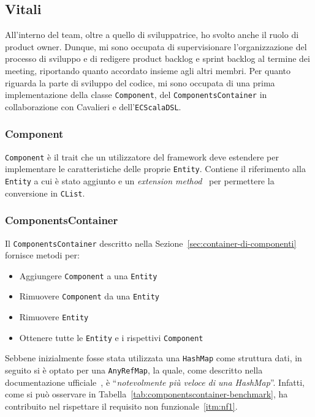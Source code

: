 \subsection{Vitali}\label{subsec:linda-vitali}
All'interno del team, oltre a quello di sviluppatrice, ho svolto anche il ruolo di product owner.
Dunque, mi sono occupata di supervisionare l'organizzazione del processo di sviluppo e di redigere
product backlog e sprint backlog al termine dei meeting, riportando quanto accordato insieme agli
altri membri.
Per quanto riguarda la parte di sviluppo del codice, mi sono occupata di una prima implementazione della classe
\texttt{Component}, del \texttt{ComponentsContainer} in collaborazione con Cavalieri e dell'\texttt{ECScalaDSL}.

\subsubsection{Component}\label{subsubsec:component-desc}
\texttt{Component} è il trait che un utilizzatore del framework deve estendere per implementare le caratteristiche delle
proprie \texttt{Entity}.
Contiene il riferimento alla \texttt{Entity} a cui è stato aggiunto e un
\textit{extension method}~\cite{extensionmethods} per permettere la conversione in \texttt{CList}.

\subsubsection{ComponentsContainer}\label{subsubsec:components-container}
Il \texttt{ComponentsContainer} descritto nella Sezione~\ref{sec:container-di-componenti} fornisce metodi per:
\begin{itemize}
    \item Aggiungere \texttt{Component} a una \texttt{Entity}
    \item Rimuovere \texttt{Component} da una \texttt{Entity}
    \item Rimuovere \texttt{Entity}
    \item Ottenere tutte le \texttt{Entity} e i rispettivi \texttt{Component}
\end{itemize}
Sebbene inizialmente fosse stata utilizzata una \texttt{HashMap} come struttura dati, in seguito si è optato per una
\texttt{AnyRefMap}, la quale, come descritto nella documentazione ufficiale~\cite{anyRefMap},
è ``\textit{notevolmente più veloce di una HashMap}''.
Infatti, come si può osservare in Tabella~\ref{tab:componentscontainer-benchmark}, ha contribuito nel rispettare il
requisito non funzionale~\ref{itm:nf1}.

